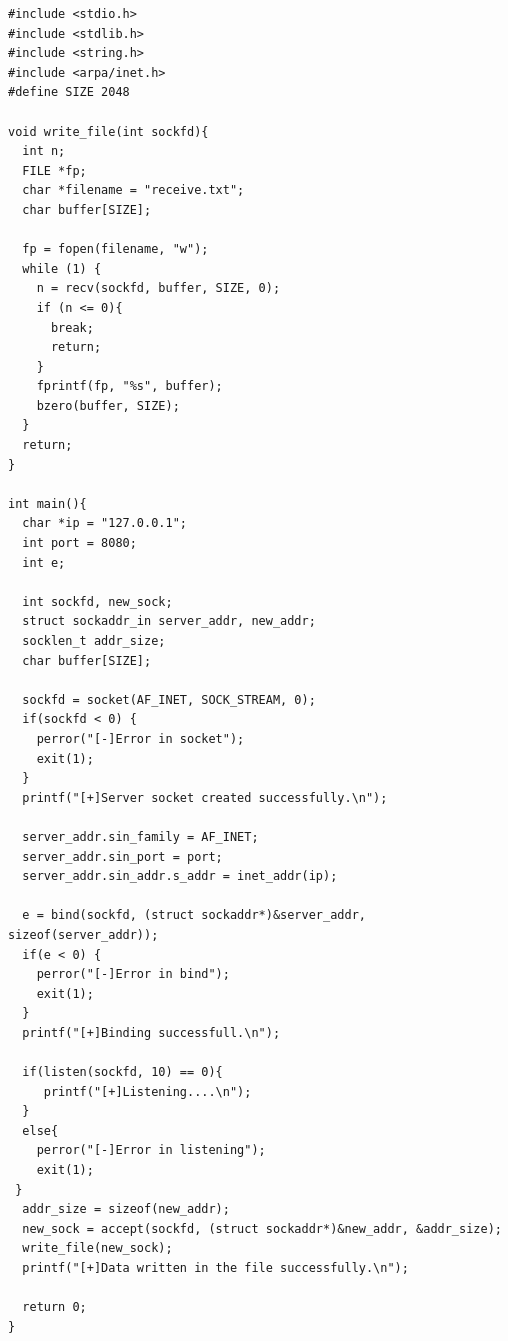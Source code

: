 \documentclass[11pt, a4paper]{article}
\begin{document}
\begin{verbatim}
#include <stdio.h>
#include <stdlib.h>
#include <string.h>
#include <arpa/inet.h>
#define SIZE 2048
 
void write_file(int sockfd){
  int n;
  FILE *fp;
  char *filename = "receive.txt";
  char buffer[SIZE];
 
  fp = fopen(filename, "w");
  while (1) {
    n = recv(sockfd, buffer, SIZE, 0);
    if (n <= 0){
      break;
      return;
    }
    fprintf(fp, "%s", buffer);
    bzero(buffer, SIZE);
  }
  return;
}
 
int main(){
  char *ip = "127.0.0.1";
  int port = 8080;
  int e;
 
  int sockfd, new_sock;
  struct sockaddr_in server_addr, new_addr;
  socklen_t addr_size;
  char buffer[SIZE];
 
  sockfd = socket(AF_INET, SOCK_STREAM, 0);
  if(sockfd < 0) {
    perror("[-]Error in socket");
    exit(1);
  }
  printf("[+]Server socket created successfully.\n");
 
  server_addr.sin_family = AF_INET;
  server_addr.sin_port = port;
  server_addr.sin_addr.s_addr = inet_addr(ip);
 
  e = bind(sockfd, (struct sockaddr*)&server_addr, sizeof(server_addr));
  if(e < 0) {
    perror("[-]Error in bind");
    exit(1);
  }
  printf("[+]Binding successfull.\n");
 
  if(listen(sockfd, 10) == 0){
     printf("[+]Listening....\n");
  }
  else{
    perror("[-]Error in listening");
    exit(1);
 }
  addr_size = sizeof(new_addr);
  new_sock = accept(sockfd, (struct sockaddr*)&new_addr, &addr_size);
  write_file(new_sock);
  printf("[+]Data written in the file successfully.\n");
 
  return 0;
}
\end{verbatim}
\end{document}
